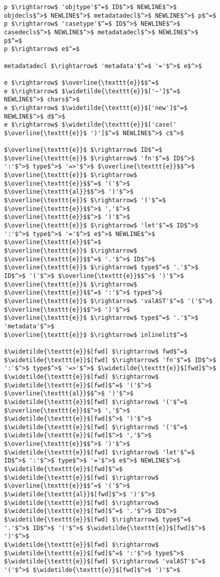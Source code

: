 
\begin{figure}
\begin{lstlisting}[mathescape]
p $\rightarrow$ 'objtype'$^=$ ID$^>$ NEWLINE$^>$ objdecls$^>$ NEWLINE$^>$ metadatadecl$^>$ NEWLINE$^>$ p$^=$
p $\rightarrow$ 'casetype'$^=$ ID$^>$ NEWLINE$^>$ casedecls$^>$ NEWLINE$^>$ metadatadecl$^>$ NEWLINE$^>$ p$^=$
p $\rightarrow$ e$^=$

metadatadecl $\rightarrow$ 'metadata'$^=$ '='$^>$ e$^>$

e $\rightarrow$ $\overline{\texttt{e}}$$^=$
e $\rightarrow$ $\widetilde{\texttt{e}}$['~']$^=$ NEWLINE$^>$ chars$^>$
e $\rightarrow$ $\widetilde{\texttt{e}}$['new']$^=$ NEWLINE$^>$ d$^>$
e $\rightarrow$ $\widetilde{\texttt{e}}$['case(' $\overline{\texttt{e}}$ ')']$^=$ NEWLINE$^>$ c$^>$

$\overline{\texttt{e}}$ $\rightarrow$ ID$^=$
$\overline{\texttt{e}}$ $\rightarrow$ 'fn'$^=$ ID$^>$ ':'$^>$ type$^>$ '=>'$^>$ $\overline{\texttt{e}}$$^>$
$\overline{\texttt{e}}$ $\rightarrow$ $\overline{\texttt{e}}$$^=$ '('$^>$ $\overline{\texttt{al}}$$^>$ ')'$^>$
$\overline{\texttt{e}}$ $\rightarrow$ '('$^=$ $\overline{\texttt{e}}$$^>$ ','$^>$ $\overline{\texttt{e}}$$^>$ ')'$^>$
$\overline{\texttt{e}}$ $\rightarrow$ 'let'$^=$ ID$^>$ ':'$^>$ type$^>$ '='$^>$ e$^>$ NEWLINE$^>$ $\overline{\texttt{e}}$$^=$
$\overline{\texttt{e}}$ $\rightarrow$ $\overline{\texttt{e}}$$^=$ '.'$^>$ ID$^>$
$\overline{\texttt{e}}$ $\rightarrow$ type$^=$ '.'$^>$ ID$^>$ '('$^>$ $\overline{\texttt{e}}$$^>$ ')'$^>$
$\overline{\texttt{e}}$ $\rightarrow$ $\overline{\texttt{e}}$$^=$ ':'$^>$ type$^>$
$\overline{\texttt{e}}$ $\rightarrow$ 'valAST'$^=$ '('$^>$ $\overline{\texttt{e}}$$^>$ ')'$^>$
$\overline{\texttt{e}}$ $\rightarrow$ type$^=$ '.'$^>$ 'metadata'$^>$
$\overline{\texttt{e}}$ $\rightarrow$ inlinelit$^=$

$\widetilde{\texttt{e}}$[fwd] $\rightarrow$ fwd$^=$
$\widetilde{\texttt{e}}$[fwd] $\rightarrow$ 'fn'$^=$ ID$^>$ ':'$^>$ type$^>$ '=>'$^>$ $\widetilde{\texttt{e}}$[fwd]$^>$
$\widetilde{\texttt{e}}$[fwd] $\rightarrow$ $\widetilde{\texttt{e}}$[fwd]$^=$ '('$^>$ $\overline{\texttt{al}}$$^>$ ')'$^>$
$\widetilde{\texttt{e}}$[fwd] $\rightarrow$ '('$^=$ $\overline{\texttt{e}}$$^>$ ','$^>$ $\widetilde{\texttt{e}}$[fwd]$^>$ ')'$^>$
$\widetilde{\texttt{e}}$[fwd] $\rightarrow$ '('$^=$ $\widetilde{\texttt{e}}$[fwd]$^>$ ','$^>$ $\overline{\texttt{e}}$$^>$ ')'$^>$
$\widetilde{\texttt{e}}$[fwd] $\rightarrow$ 'let'$^=$ ID$^>$ ':'$^>$ type$^>$ '='$^>$ e$^>$ NEWLINE$^>$ $\widetilde{\texttt{e}}$[fwd]$^=$
$\widetilde{\texttt{e}}$[fwd] $\rightarrow$ $\overline{\texttt{e}}$$^=$ '('$^>$ $\widetilde{\texttt{al}}$[fwd]$^>$ ')'$^>$
$\widetilde{\texttt{e}}$[fwd] $\rightarrow$ $\widetilde{\texttt{e}}$[fwd]$^=$ '.'$^>$ ID$^>$
$\widetilde{\texttt{e}}$[fwd] $\rightarrow$ type$^=$ '.'$^>$ ID$^>$ '('$^>$ $\widetilde{\texttt{e}}$[fwd]$^>$ ')'$^>$
$\widetilde{\texttt{e}}$[fwd] $\rightarrow$ $\widetilde{\texttt{e}}$[fwd]$^=$ ':'$^>$ type$^>$
$\widetilde{\texttt{e}}$[fwd] $\rightarrow$ 'valAST'$^=$ '('$^>$ $\widetilde{\texttt{e}}$[fwd]$^>$ ')'$^>$


\end{lstlisting}
\end{figure}
